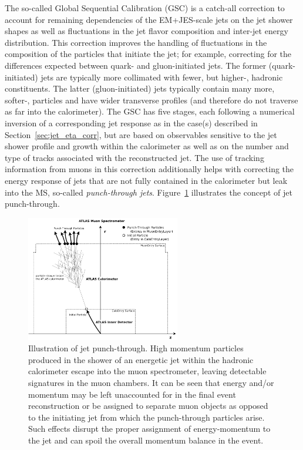 The so-called Global Sequential Calibration (GSC) is a catch-all correction to account for remaining dependencies
of the EM+JES-scale jets on the jet shower shapes as well as fluctuations in the jet flavor composition and inter-jet energy distribution.
This correction improves the handling of fluctuations in the composition of the particles that initiate the jet; for example, correcting for the differences expected between quark- and gluon-initiated jets.
The former (quark-initiated) jets are typically more collimated with fewer, but higher-\pT, hadronic constituents.
The latter (gluon-initiated) jets typically contain many more, softer-\pT, particles and have wider transverse profiles
(and therefore do not traverse as far into the calorimeter).
The GSC has five stages, each following a numerical inversion of a corresponding jet response as in the case(s)
described in Section~\ref{sec:jet_eta_corr}, but are based on observables sensitive to the jet shower profile and growth
within the calorimeter as well as on the number and type of tracks associated with the reconstructed jet.
The use of tracking information from muons in this correction additionally helps with correcting the energy response of jets that
are not fully contained in the calorimeter but leak into the MS, so-called \textit{punch-through jets}.
Figure~\ref{fig:jet_punch_through} illustrates the concept of jet punch-through.

\begin{figure}[!htb]
    \begin{center}
        \includegraphics[width=0.6\textwidth]{figures/chapter3/jets/jet_punch_through}
        \caption{
            Illustration of jet punch-through.
            High momentum particles produced in the shower of an energetic jet within
            the hadronic calorimeter escape into the muon spectrometer, leaving detectable
            signatures in the muon chambers.
            It can be seen that energy and/or momentum may be left unaccounted for in the final event reconstruction or be assigned to separate muon objects as opposed to the
            initiating jet from which the punch-through particles arise.
            Such effects disrupt the proper
            assignment of energy-momentum to the jet and can spoil the overall momentum balance in the event.
        }
        \label{fig:jet_punch_through}
    \end{center}
\end{figure}

